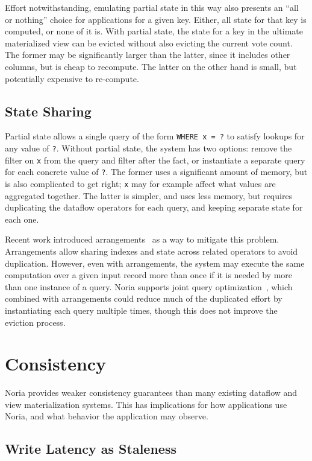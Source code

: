 Effort notwithstanding, emulating partial state in this way also presents an
``all or nothing'' choice for applications for a given key. Either, all state
for that key is computed, or none of it is. With partial state, the state for a
key in the ultimate materialized view can be evicted without also evicting the
current vote count. The former may be significantly larger than the latter,
since it includes other columns, but is cheap to recompute. The latter on the
other hand is small, but potentially expensive to re-compute.

\subsection{State Sharing}

Partial state allows a single query of the form \texttt{WHERE x = ?} to satisfy
lookups for any value of \texttt{?}. Without partial state, the system has two
options: remove the filter on \texttt{x} from the query and filter after the
fact, or instantiate a separate query for each concrete value of \texttt{?}. The
former uses a significant amount of memory, but is also complicated to get
right; \texttt{x} may for example affect what values are aggregated together.
The latter is simpler, and uses less memory, but requires duplicating the
dataflow operators for each query, and keeping separate state for each one.

Recent work introduced arrangements~\cite{arrangements} as a way to mitigate
this problem. Arrangements allow sharing indexes and state across related
operators to avoid duplication. However, even with arrangements, the system may
execute the same computation over a given input record more than once if it is
needed by more than one instance of a query. Noria supports joint query
optimization~\cite{noria}, which combined with arrangements could reduce much of
the duplicated effort by instantiating each query multiple times, though this
does not improve the eviction process.

\section{Consistency}

Noria provides weaker consistency guarantees than many existing dataflow and
view materialization systems. This has implications for how applications use
Noria, and what behavior the application may observe.

\subsection{Write Latency as Staleness}

